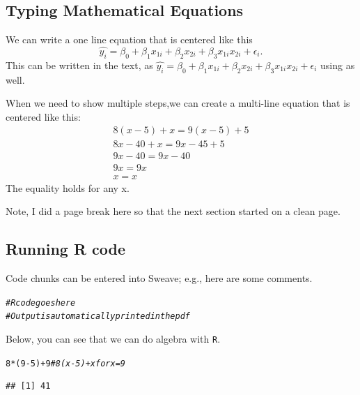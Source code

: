 \documentclass{article}\usepackage[]{graphicx}\usepackage[]{xcolor}
\makeatletter
\newcommand{\hlnum}[1]{\textcolor[rgb]{0.686,0.059,0.569}{#1}}%
\newcommand{\hlcom}[1]{\textcolor[rgb]{0.678,0.584,0.686}{\textit{#1}}}%
\newcommand{\hlopt}[1]{\textcolor[rgb]{0,0,0}{#1}}%
\newcommand{\hldef}[1]{\textcolor[rgb]{0.345,0.345,0.345}{#1}}%
\newenvironment{kframe}{%
 \def\at@end@of@kframe{}%
 \ifinner\ifhmode%
  \def\at@end@of@kframe{\end{minipage}}%
  \begin{minipage}{\columnwidth}%
 \fi\fi%
 \def\FrameCommand##1{\hskip\@totalleftmargin \hskip-\fboxsep
 \colorbox{shadecolor}{##1}\hskip-\fboxsep
     \hskip-\linewidth \hskip-\@totalleftmargin \hskip\columnwidth}%
 \MakeFramed {\advance\hsize-\width
   \@totalleftmargin\z@ \linewidth\hsize
   \@setminipage}}%
 {\par\unskip\endMakeFramed%
 \at@end@of@kframe}
\newenvironment{knitrout}{}{} %
\makeatother
\begin{document}
\begin{multicols}{2}
\subsection{Typing Mathematical Equations}
We can write a one line equation that is centered like this
\[\widehat{y_i} = \beta_0 + \beta_1 x_{1i}+ \beta_2 x_{2i} +\beta_3 x_{1i} x_{2i} + \epsilon_i.\]
This can be written in the text, as $\widehat{y_i} = \beta_0 + \beta_1 x_{1i}+ \beta_2 x_{2i} +\beta_3 x_{1i} x_{2i} + \epsilon_i$ using as well.

When we need to show multiple steps,we can create a
 multi-line equation that is centered like this:
\begin{align*}
 8(x-5)+x=9(x-5)+5\\
 8x-40+x=9x-45+5 \tag{Distributing}\\
 9x-40=9x-40 \tag{Combining like terms}\\
 9x=9x \tag{Adding 40 to both sides}\\
 x=x \tag{Dividing both sides by 9}
\end{align*}
The equality holds for any x.

Note, I did a page break here so that the next section
 started on a clean page.
\pagebreak

\subsection{Running R code}
 Code chunks can be entered into Sweave; e.g., here are some
 comments.
\begin{knitrout}
\color{fgcolor}\begin{kframe}
\begin{alltt}
\hlcom{# R code goes here}
\hlcom{# Output is automatically printed in the pdf}
\end{alltt}
\end{kframe}
\end{knitrout}
 
Below, you can see that we can do algebra with \texttt{R}.

\begin{knitrout}
\color{fgcolor}\begin{kframe}
\begin{alltt}
\hlnum{8}\hlopt{*}\hldef{(}\hlnum{9}\hlopt{-}\hlnum{5}\hldef{)}\hlopt{+}\hlnum{9} \hlcom{# 8(x-5) + x for x=9}
\end{alltt}
\begin{verbatim}
## [1] 41
\end{verbatim}
\end{kframe}
\end{knitrout}


\end{multicols}
\end{document}
